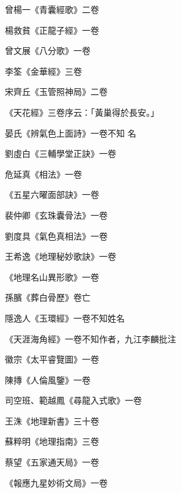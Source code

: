 \begin{pinyinscope}
 曾楊一《青囊經歌》二卷



 楊救貧《正龍子經》一卷



 曾文展《八分歌》一卷



 李筌《金華經》三卷



 宋齊丘《玉管照神局》二卷



 《天花經》三卷序云：「黃巢得於長安。」



 晏氏《辨氣色上面詩》一卷不知
 名



 劉虛白《三輔學堂正訣》一卷



 危延真《相法》一卷



 《五星六曜面部訣》一卷



 裴仲卿《玄珠囊骨法》一卷



 劉度具《氣色真相法》一卷



 王希逸《地理秘妙歌訣》一卷



 《地理名山異形歌》一卷



 孫臏《葬白骨歷》卷亡



 隱逸人《玉環經》一卷不知姓名



 《天涯海角經》一卷不知作者，九江李麟批注



 徽宗《太平睿覽圖》一卷



 陳摶《人倫風鑒》一卷



 司空班、範越鳳《尋龍入式歌》一卷



 王洙《地理新書》三十卷



 蘇粹明《地理指南》三卷



 蔡望《五家通天局》一卷



 《報應九星妙術文局》一卷




\end{pinyinscope}

